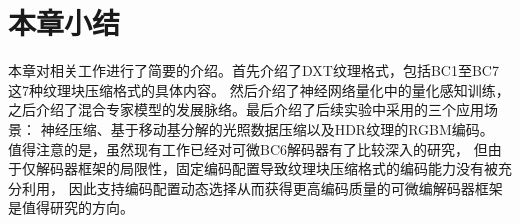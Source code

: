     


\section{本章小结}

本章对相关工作进行了简要的介绍。首先介绍了DXT纹理格式，包括BC1至BC7这7种纹理块压缩格式的具体内容。
然后介绍了神经网络量化中的量化感知训练，
之后介绍了混合专家模型的发展脉络。最后介绍了后续实验中采用的三个应用场景：
神经压缩、基于移动基分解的光照数据压缩以及HDR纹理的RGBM编码。
值得注意的是，虽然现有工作已经对可微BC6解码器有了比较深入的研究，
但由于仅解码器框架的局限性，固定编码配置导致纹理块压缩格式的编码能力没有被充分利用，
因此支持编码配置动态选择从而获得更高编码质量的可微编解码器框架是值得研究的方向。
